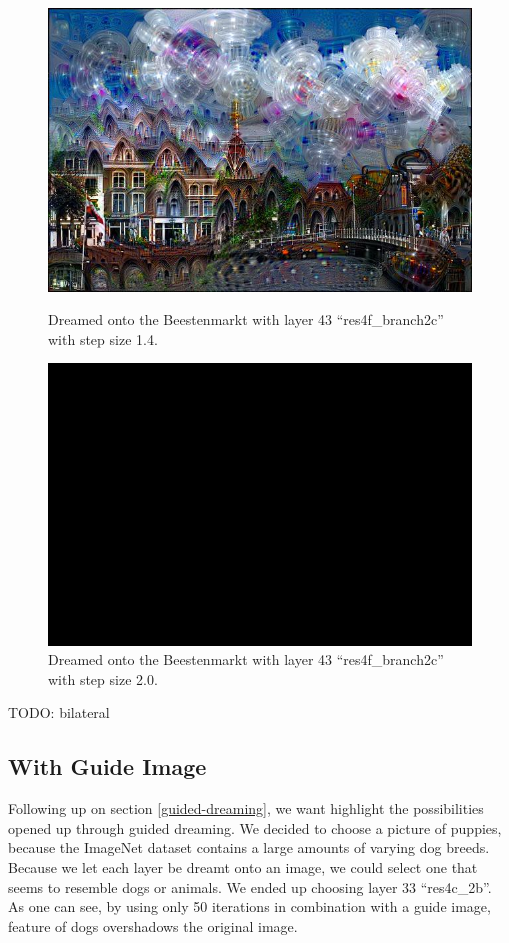 \begin{figure}[H]
	\centering
	\includegraphics[width=1\linewidth]{img/houses1.jpg}
	\caption{Dreamed onto the Beestenmarkt with layer 43 \enquote{res4f\_branch2c} with step size 1.4.}
	\label{fig:houses1}
	\endminipage\hfill
	\centering
	\includegraphics[width=1\linewidth]{img/houses2.jpg}
	\caption{Dreamed onto the Beestenmarkt with layer 43 \enquote{res4f\_branch2c} with step size 2.0.}
	\label{fig:houses2}
	\endminipage\hfill
\end{figure}

TODO: bilateral


\subsection{With Guide Image}
\label{sec:withguide}
Following up on section \ref{guided-dreaming}, we want highlight the possibilities opened up through guided dreaming.
We decided to choose a picture of puppies, because the ImageNet dataset contains a large amounts of varying dog breeds.
Because we let each layer be dreamt onto an image, we could select one that seems to resemble dogs or animals.
We ended up choosing layer 33 \enquote{res4c\_2b}.
As one can see, by using only 50 iterations in combination with a guide image, feature of dogs overshadows the original image.

